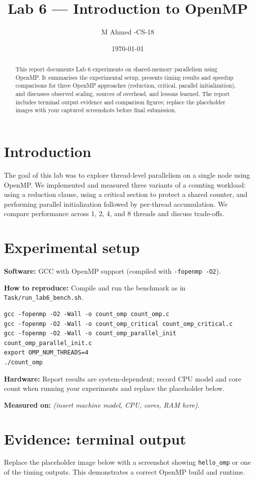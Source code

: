 \documentclass[11pt,a4paper]{article}
\title{Lab 6 — Introduction to OpenMP}
\author{M Ahmed \quad 2023-CS-18}
\date{\today}
\begin{document}
\maketitle

\begin{abstract}
This report documents Lab 6 experiments on shared-memory parallelism using OpenMP. It summarises the experimental setup, presents timing results and speedup comparisons for three OpenMP approaches (reduction, critical, parallel initialization), and discusses observed scaling, sources of overhead, and lessons learned. The report includes terminal output evidence and comparison figures; replace the placeholder images with your captured screenshots before final submission.
\end{abstract}

\section{Introduction}
The goal of this lab was to explore thread-level parallelism on a single node using OpenMP. We implemented and measured three variants of a counting workload: using a reduction clause, using a critical section to protect a shared counter, and performing parallel initialization followed by per-thread accumulation. We compare performance across 1, 2, 4, and 8 threads and discuss trade-offs.

\section{Experimental setup}
\textbf{Software:} GCC with OpenMP support (compiled with \texttt{-fopenmp -O2}).

\textbf{How to reproduce:}
Compile and run the benchmark as in \texttt{Task/run_lab6_bench.sh}.

\begin{verbatim}
gcc -fopenmp -O2 -Wall -o count_omp count_omp.c
gcc -fopenmp -O2 -Wall -o count_omp_critical count_omp_critical.c
gcc -fopenmp -O2 -Wall -o count_omp_parallel_init count_omp_parallel_init.c
export OMP_NUM_THREADS=4
./count_omp
\end{verbatim}

\textbf{Hardware:} Report results are system-dependent; record CPU model and core count when running your experiments and replace the placeholder below.

\textbf{Measured on:} \emph{(insert machine model, CPU, cores, RAM here)}.

\section{Evidence: terminal output}
Replace the placeholder image below with a screenshot showing \texttt{hello\_omp} or one of the timing outputs. This demonstrates a correct OpenMP build and runtime.
\end{document}
